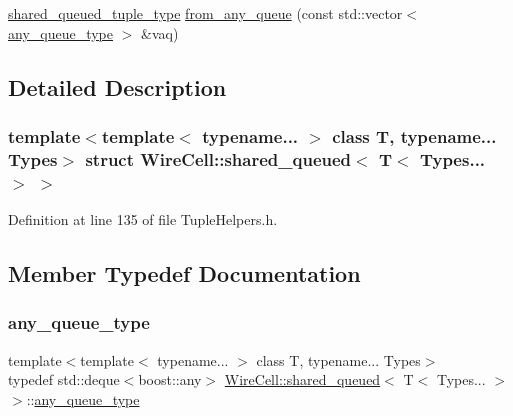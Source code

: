 \begin{DoxyCompactItemize}
\item 
\hyperlink{struct_wire_cell_1_1shared__queued_3_01_t_3_01_types_8_8_8_01_4_01_4_ab8420ec9cbc02f0d73f0e7521a063cb0}{shared\+\_\+queued\+\_\+tuple\+\_\+type} \hyperlink{struct_wire_cell_1_1shared__queued_3_01_t_3_01_types_8_8_8_01_4_01_4_aa9a1f473b6503cd70756adf590f008c3}{from\+\_\+any\+\_\+queue} (const std\+::vector$<$ \hyperlink{struct_wire_cell_1_1shared__queued_3_01_t_3_01_types_8_8_8_01_4_01_4_a8ff8e1f0ff23fd750a91eeb2d4952bb0}{any\+\_\+queue\+\_\+type} $>$ \&vaq)
\end{DoxyCompactItemize}


\subsection{Detailed Description}
\subsubsection*{template$<$template$<$ typename... $>$ class T, typename... Types$>$\newline
struct Wire\+Cell\+::shared\+\_\+queued$<$ T$<$ Types... $>$ $>$}



Definition at line 135 of file Tuple\+Helpers.\+h.



\subsection{Member Typedef Documentation}
\mbox{\label{struct_wire_cell_1_1shared__queued_3_01_t_3_01_types_8_8_8_01_4_01_4_a8ff8e1f0ff23fd750a91eeb2d4952bb0}} 
\subsubsection{\texorpdfstring{any\+\_\+queue\+\_\+type}{any\_queue\_type}}
{\footnotesize\ttfamily template$<$template$<$ typename... $>$ class T, typename... Types$>$ \\
typedef std\+::deque$<$boost\+::any$>$ \hyperlink{struct_wire_cell_1_1shared__queued}{Wire\+Cell\+::shared\+\_\+queued}$<$ T$<$ Types... $>$ $>$\+::\hyperlink{struct_wire_cell_1_1shared__queued_3_01_t_3_01_types_8_8_8_01_4_01_4_a8ff8e1f0ff23fd750a91eeb2d4952bb0}{any\+\_\+queue\+\_\+type}}



